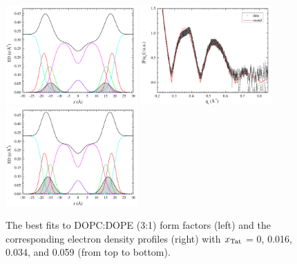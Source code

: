 \begin{figure}[htbp]
  \includegraphics[width=0.45\textwidth,valign=t]{./figures/Tat/SDP_Results/EDP/DOPCDOPE3to1_Tat_28to1_3p0_EDP1}
  \includegraphics[width=0.45\textwidth,valign=t]{figures/Tat/SDP_Results/XFF/DOPCDOPE3to1_Tat_16to1_3p0_XFF1}
  \includegraphics[width=0.45\textwidth,valign=t]{./figures/Tat/SDP_Results/EDP/DOPCDOPE3to1_Tat_16to1_3p0_EDP1}
  \caption{The best fits to DOPC:DOPE (3:1) form factors (left) and the corresponding 
  electron density profiles (right) with $x_\textrm{Tat}$ = 0, 0.016, 0.034, 
  and 0.059 (from top to bottom).}
  \label{fig:DOPCDOPE3to1_Tat_XFF1}
\end{figure}
